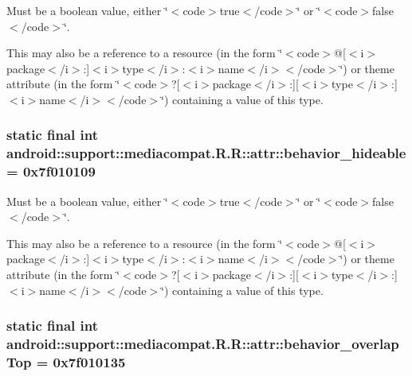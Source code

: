 Must be a boolean value, either \char`\"{}$<$code$>$true$<$/code$>$\char`\"{} or \char`\"{}$<$code$>$false$<$/code$>$\char`\"{}. 

This may also be a reference to a resource (in the form \char`\"{}$<$code$>$@\mbox{[}$<$i$>$package$<$/i$>$:\mbox{]}$<$i$>$type$<$/i$>$:$<$i$>$name$<$/i$>$$<$/code$>$\char`\"{}) or theme attribute (in the form \char`\"{}$<$code$>$?\mbox{[}$<$i$>$package$<$/i$>$:\mbox{]}\mbox{[}$<$i$>$type$<$/i$>$:\mbox{]}$<$i$>$name$<$/i$>$$<$/code$>$\char`\"{}) containing a value of this type. \hypertarget{classandroid_1_1support_1_1mediacompat_1_1_r_1_1attr_95066872a3cb8936188aa27d38ddb178}{
\subsubsection[{behavior\_\-hideable}]{\setlength{\rightskip}{0pt plus 5cm}static final int android::support::mediacompat.R.R::attr::behavior\_\-hideable = 0x7f010109}}
\label{classandroid_1_1support_1_1mediacompat_1_1_r_1_1attr_95066872a3cb8936188aa27d38ddb178}


Must be a boolean value, either \char`\"{}$<$code$>$true$<$/code$>$\char`\"{} or \char`\"{}$<$code$>$false$<$/code$>$\char`\"{}. 

This may also be a reference to a resource (in the form \char`\"{}$<$code$>$@\mbox{[}$<$i$>$package$<$/i$>$:\mbox{]}$<$i$>$type$<$/i$>$:$<$i$>$name$<$/i$>$$<$/code$>$\char`\"{}) or theme attribute (in the form \char`\"{}$<$code$>$?\mbox{[}$<$i$>$package$<$/i$>$:\mbox{]}\mbox{[}$<$i$>$type$<$/i$>$:\mbox{]}$<$i$>$name$<$/i$>$$<$/code$>$\char`\"{}) containing a value of this type. \hypertarget{classandroid_1_1support_1_1mediacompat_1_1_r_1_1attr_2e0063b62da9162ed8e1d41980018118}{
\subsubsection[{behavior\_\-overlapTop}]{\setlength{\rightskip}{0pt plus 5cm}static final int android::support::mediacompat.R.R::attr::behavior\_\-overlapTop = 0x7f010135}}
\label{classandroid_1_1support_1_1mediacompat_1_1_r_1_1attr_2e0063b62da9162ed8e1d41980018118}


